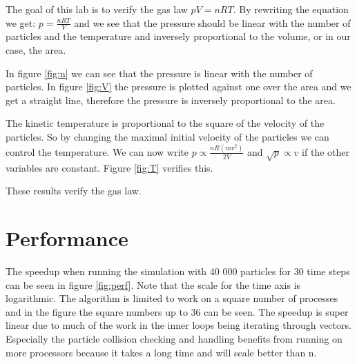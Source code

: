 \documentclass[a4paper, 12pt]{article}
\begin{document}
The goal of this lab is to verify the gas law $pV = nRT$.
By rewriting the equation we get: $p = \frac{nRT}{V}$ and we see that the
pressure should be linear with the number of particles and the temperature and
inversely proportional to the volume, or in our case, the area.

In figure \ref{fig:n} we can see that the pressure is linear with the number of
particles. In figure \ref{fig:V} the pressure is plotted against one over the
area and we get a straight line, therefore the pressure is inversely
proportional to the area.

The kinetic temperature is proportional to the square of the velocity of the
particles. So by changing the maximal initial velocity of the particles we can
control the temperature. We can now write $p \propto \frac{nR(mv^2)}{2V}$ and
$\sqrt{p} \propto v$ if the other variables are constant. Figure \ref{fig:T}
verifies this.

These results verify the gas law.

\section{Performance}
The speedup when running the simulation with 40 000 particles for 30 time
steps can be seen in figure \ref{fig:perf}. Note that the scale for the time
axis is logarithmic. The algorithm is limited to work on a square
number of processes and in the figure the square numbers up to 36 can be seen.
The speedup is super linear due to much of the work in the inner loops being 
iterating through vectors. Especially the particle collision checking and
handling benefits from running on more processors because it takes a long time
and will scale better than n.
\end{document}
